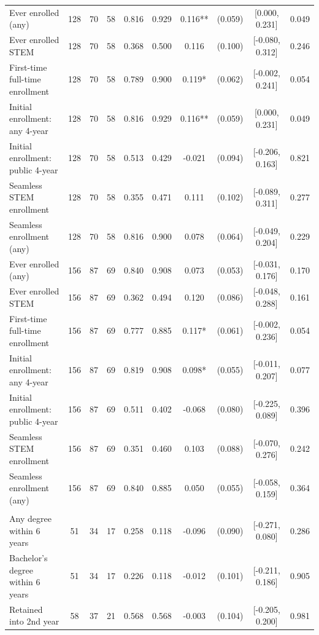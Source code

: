 \begin{table}[t]
\begin{tabular*}{\linewidth}{@{\extracolsep{\fill}}l|ccccccccc}
Ever enrolled (any) & 128 & 70 & 58 & 0.816 & 0.929 & 0.116** & (0.059) & [0.000, 0.231] & 0.049 \\ 
Ever enrolled STEM & 128 & 70 & 58 & 0.368 & 0.500 & 0.116 & (0.100) & [-0.080, 0.312] & 0.246 \\ 
First-time full-time enrollment & 128 & 70 & 58 & 0.789 & 0.900 & 0.119* & (0.062) & [-0.002, 0.241] & 0.054 \\ 
Initial enrollment: any 4-year & 128 & 70 & 58 & 0.816 & 0.929 & 0.116** & (0.059) & [0.000, 0.231] & 0.049 \\ 
Initial enrollment: public 4-year & 128 & 70 & 58 & 0.513 & 0.429 & -0.021 & (0.094) & [-0.206, 0.163] & 0.821 \\ 
Seamless STEM enrollment & 128 & 70 & 58 & 0.355 & 0.471 & 0.111 & (0.102) & [-0.089, 0.311] & 0.277 \\ 
Seamless enrollment (any) & 128 & 70 & 58 & 0.816 & 0.900 & 0.078 & (0.064) & [-0.049, 0.204] & 0.229 \\ 
Ever enrolled (any) & 156 & 87 & 69 & 0.840 & 0.908 & 0.073 & (0.053) & [-0.031, 0.176] & 0.170 \\ 
Ever enrolled STEM & 156 & 87 & 69 & 0.362 & 0.494 & 0.120 & (0.086) & [-0.048, 0.288] & 0.161 \\ 
First-time full-time enrollment & 156 & 87 & 69 & 0.777 & 0.885 & 0.117* & (0.061) & [-0.002, 0.236] & 0.054 \\ 
Initial enrollment: any 4-year & 156 & 87 & 69 & 0.819 & 0.908 & 0.098* & (0.055) & [-0.011, 0.207] & 0.077 \\ 
Initial enrollment: public 4-year & 156 & 87 & 69 & 0.511 & 0.402 & -0.068 & (0.080) & [-0.225, 0.089] & 0.396 \\ 
Seamless STEM enrollment & 156 & 87 & 69 & 0.351 & 0.460 & 0.103 & (0.088) & [-0.070, 0.276] & 0.242 \\ 
Seamless enrollment (any) & 156 & 87 & 69 & 0.840 & 0.885 & 0.050 & (0.055) & [-0.058, 0.159] & 0.364 \\ 
\midrule\addlinespace[2.5pt]
\multicolumn{10}{l}{{\itshape \textbf{Panel C: Degree and Persistence Outcomes} \emph{(non-censored subsample)}}} \\[2.5pt] 
\midrule\addlinespace[2.5pt]
Any degree within 6 years & 51 & 34 & 17 & 0.258 & 0.118 & -0.096 & (0.090) & [-0.271, 0.080] & 0.286 \\ 
Bachelor's degree within 6 years & 51 & 34 & 17 & 0.226 & 0.118 & -0.012 & (0.101) & [-0.211, 0.186] & 0.905 \\ 
Retained into 2nd year & 58 & 37 & 21 & 0.568 & 0.568 & -0.003 & (0.104) & [-0.205, 0.200] & 0.981 \\ 

\end{tabular*}
\end{table}
